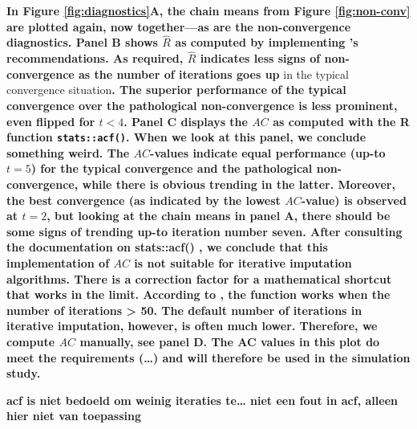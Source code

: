 \documentclass[Royal,times,sageh]{sagej}
\begin{document}
\textbf{In Figure \ref{fig:diagnostics}A, the chain means from Figure
\ref{fig:non-conv} are plotted again, now together---as are the
non-convergence diagnostics. Panel B shows \(\widehat{R}\) as computed
by implementing \citet{veht19} 's recommendations. As required,
\(\widehat{R}\) indicates less signs of non-convergence as the number of
iterations goes up }in the typical convergence situation\textbf{. The
superior performance of the typical convergence over the pathological
non-convergence is less prominent, even flipped for \(t<4\). Panel C
displays the \(AC\) as computed with the R function
\texttt{stats::acf()}. When we look at this panel, we conclude something
weird. The \(AC\)-values indicate equal performance (up-to \(t=5\)) for
the typical convergence and the pathological non-convergence, while
there is obvious trending in the latter. Moreover, the best convergence
(as indicated by the lowest \(AC\)-value) is observed at \(t=2\), but
looking at the chain means in panel A, there should be some signs of
trending up-to iteration number seven. After consulting the
documentation on stats::acf() \citep{R}, we conclude that this
implementation of \(AC\) is not suitable for iterative imputation
algorithms. There is a correction factor for a mathematical shortcut
that works in the limit. According to \citet{box15}, the function works
when the number of iterations \textgreater{} 50. The default number of
iterations in iterative imputation, however, is often much lower.
Therefore, we compute \(AC\) manually, see panel D. The AC values in
this plot do meet the requirements (\ldots) and will therefore be used
in the simulation study.}

\textbf{acf is niet bedoeld om weinig iteraties te\ldots{} niet een fout
in acf, alleen hier niet van toepassing}
\end{document}
